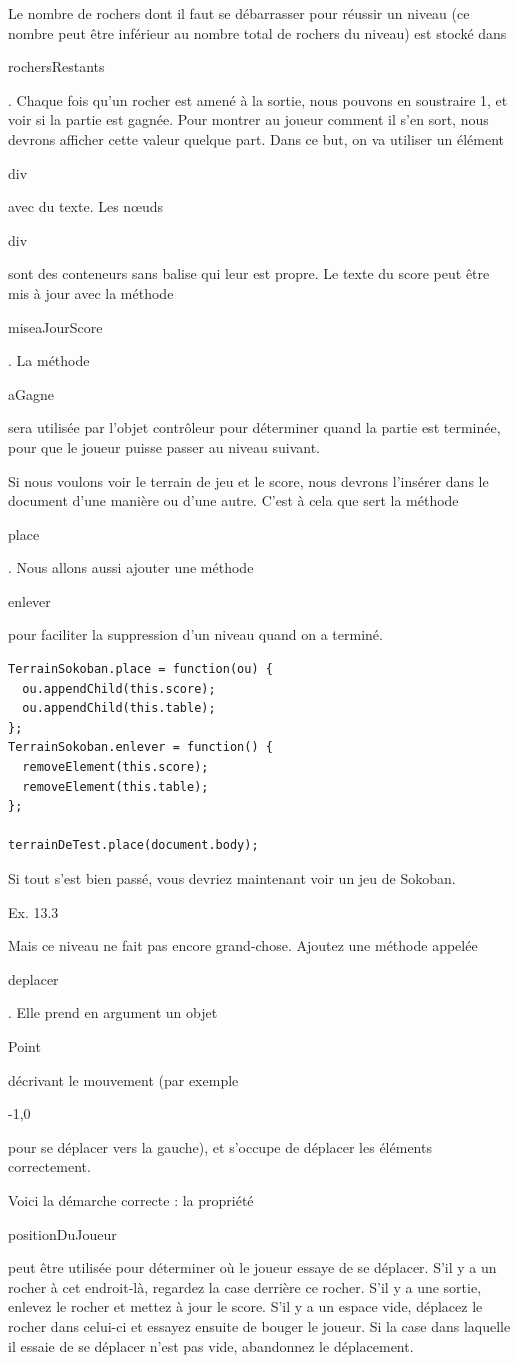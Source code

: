 \documentclass{FramateX}
\renewcommand{\texttt}[1]{\begin{sffamily}{#1}\end{sffamily}}
\begin{document}
Le nombre de rochers dont il faut se débarrasser pour réussir un niveau
(ce nombre peut être inférieur au nombre total de rochers du niveau) est
stocké dans \texttt{rochersRestants}. Chaque fois qu'un rocher est amené
à la sortie, nous pouvons en soustraire 1, et voir si la partie est
gagnée. Pour montrer au joueur comment il s'en sort, nous devrons
afficher cette valeur quelque part. Dans ce but, on va utiliser un
élément \texttt{div} avec du texte. Les nœuds \texttt{div} sont des
conteneurs sans balise qui leur est propre. Le texte du score peut être
mis à jour avec la méthode \texttt{miseaJourScore}. La méthode
\texttt{aGagne} sera utilisée par l'objet contrôleur pour déterminer
quand la partie est terminée, pour que le joueur puisse passer au niveau
suivant.

\begin{center}\end{center}

Si nous voulons voir le terrain de jeu et le score, nous devrons
l'insérer dans le document d'une manière ou d'une autre. C'est à cela
que sert la méthode \texttt{place}. Nous allons aussi ajouter une
méthode \texttt{enlever} pour faciliter la suppression d'un niveau quand
on a terminé.

\begin{lstlisting}
TerrainSokoban.place = function(ou) {
  ou.appendChild(this.score);
  ou.appendChild(this.table);
};
TerrainSokoban.enlever = function() {
  removeElement(this.score);
  removeElement(this.table);
};

terrainDeTest.place(document.body);
\end{lstlisting}
Si tout s'est bien passé, vous devriez maintenant voir un jeu de
Sokoban.

\begin{center}\end{center}

Ex. 13.3

Mais ce niveau ne fait pas encore grand-chose. Ajoutez une méthode
appelée \texttt{deplacer}. Elle prend en argument un objet
\texttt{Point} décrivant le mouvement (par exemple \texttt{-1,0} pour se
déplacer vers la gauche), et s'occupe de déplacer les éléments
correctement.

Voici la démarche correcte : la propriété \texttt{positionDuJoueur} peut
être utilisée pour déterminer où le joueur essaye de se déplacer. S'il y
a un rocher à cet endroit-là, regardez la case derrière ce rocher. S'il
y a une sortie, enlevez le rocher et mettez à jour le score. S'il y a un
espace vide, déplacez le rocher dans celui-ci et essayez ensuite de
bouger le joueur. Si la case dans laquelle il essaie de se déplacer
n'est pas vide, abandonnez le déplacement.
\end{document}
